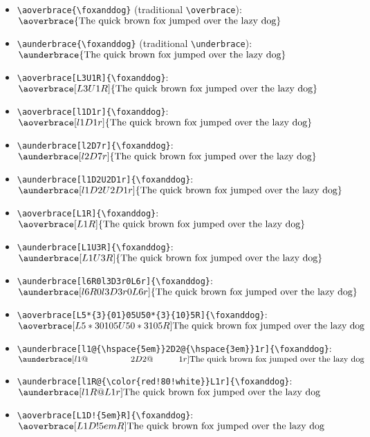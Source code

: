 \documentclass{ltxdockit}[2011/03/25]
\begin{document}
\newcommand{\foxanddog}{%
  \textrm{The quick brown fox jumped over the lazy dog}}
\begin{itemize}
  \item \lstinline!\aoverbrace{\foxanddog}! (traditional \lstinline!\overbrace!): \\ $\aoverbrace{\foxanddog}$
  \item \lstinline!\aunderbrace{\foxanddog}! (traditional \lstinline!\underbrace!): \\ $\aunderbrace{\foxanddog}$
  \item \lstinline!\aoverbrace[L3U1R]{\foxanddog}!: \\ $\aoverbrace[L3U1R]{\foxanddog}$
  \item \lstinline!\aoverbrace[l1D1r]{\foxanddog}!: \\ $\aoverbrace[l1D1r]{\foxanddog}$
  \item \lstinline!\aunderbrace[l2D7r]{\foxanddog}!: \\ $\aunderbrace[l2D7r]{\foxanddog}$
  \item \lstinline!\aunderbrace[l1D2U2D1r]{\foxanddog}!: \\ $\aunderbrace[l1D2U2D1r]{\foxanddog}$
  \item \lstinline!\aoverbrace[L1R]{\foxanddog}!: \\ $\aoverbrace[L1R]{\foxanddog}$
  \item \lstinline!\aunderbrace[L1U3R]{\foxanddog}!: \\ $\aunderbrace[L1U3R]{\foxanddog}$
  \item \lstinline!\aunderbrace[l6R0l3D3r0L6r]{\foxanddog}!: \\ $\aunderbrace[l6R0l3D3r0L6r]{\foxanddog}$
  \item \lstinline!\aoverbrace[L5*{3}{01}05U50*{3}{10}5R]{\foxanddog}!: \\ $\aoverbrace[L5*{3}{01}05U50*{3}{10}5R]{\foxanddog}$
  \item \lstinline!\aunderbrace[l1@{\hspace{5em}}2D2@{\hspace{3em}}1r]{\foxanddog}!: \\ $\aunderbrace[l1@{\hspace{5em}}2D2@{\hspace{3em}}1r]{\foxanddog}$
  \item \lstinline~\aunderbrace[l1R@{\color{red!80!white}}L1r]{\foxanddog}~: \\ $\aunderbrace[l1R@{\color{red!80!white}}L1r]{\foxanddog}$
  \item \lstinline~\aoverbrace[L1D!{5em}R]{\foxanddog}~: \\ $\aoverbrace[L1D!{5em}R]{\foxanddog}$
\end{itemize}
\end{document}
